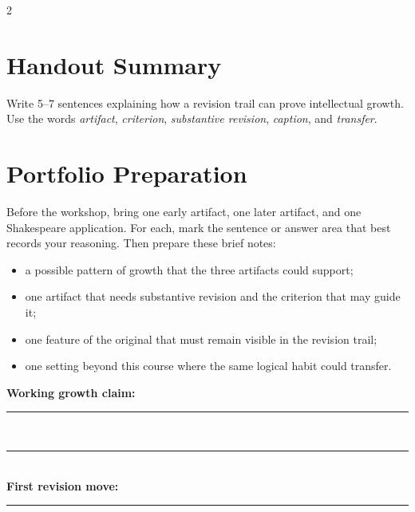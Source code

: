 \documentclass[12pt]{article}
\begin{document}
\begin{multicols}{2}
\section*{Handout Summary}
Write 5--7 sentences explaining how a revision trail can prove intellectual growth. Use the words \textit{artifact}, \textit{criterion}, \textit{substantive revision}, \textit{caption}, and \textit{transfer}.

\section*{Portfolio Preparation}
Before the workshop, bring one early artifact, one later artifact, and one Shakespeare application. For each, mark the sentence or answer area that best records your reasoning. Then prepare these brief notes:
\begin{itemize}[leftmargin=*]
\item a possible pattern of growth that the three artifacts could support;
\item one artifact that needs substantive revision and the criterion that may guide it;
\item one feature of the original that must remain visible in the revision trail;
\item one setting beyond this course where the same logical habit could transfer.
\end{itemize}

\textbf{Working growth claim:} \rule{0.48\columnwidth}{0.4pt}\\[1.1em]
\rule{\columnwidth}{0.4pt}\\[1.1em]
\textbf{First revision move:} \rule{0.48\columnwidth}{0.4pt}
\end{multicols}
\end{document}
